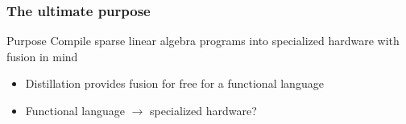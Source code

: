 \documentclass[xcolor=table]{beamer}
\begin{document}
\begin{frame}[fragile] \frametitle{The ultimate purpose}
    
    \begin{block}{Purpose}
    Compile sparse linear algebra programs into specialized hardware with fusion in mind
    \end{block}
    \begin{itemize}
    \vfill
        \item Distillation provides fusion for free for a functional language
        \vfill
        \item Functional language $\to$ specialized hardware? 
    \end{itemize}
      
\end{frame}
\end{document}
